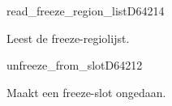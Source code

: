 \begin{hyppotrap}{read\_freeze\_region\_list}{D642}{14}

\item [Dienst:]  Leest de freeze-regiolijst.
\item [Geschiedenis:]
\end{hyppotrap}


\begin{hyppotrap}{unfreeze\_from\_slot}{D642}{12}

\item [Dienst:]  Maakt een freeze-slot ongedaan.
\item [Geschiedenis:]
\end{hyppotrap}

